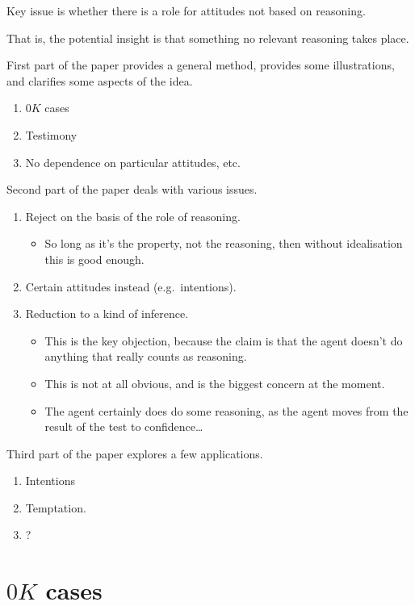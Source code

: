 \documentclass[10pt]{article}
\begin{document}
Key issue is whether there is a role for attitudes not based on reasoning.

That is, the potential insight is that something no relevant reasoning takes place.



First part of the paper provides a general method, provides some illustrations, and clarifies some aspects of the idea.
\begin{enumerate}
\item \(0K\) cases
\item Testimony
\item No dependence on particular attitudes, etc.\
\end{enumerate}

Second part of the paper deals with various issues.
\begin{enumerate}
\item Reject on the basis of the role of reasoning.
  \begin{itemize}
  \item So long as it's the property, not the reasoning, then without idealisation this is good enough.
  \end{itemize}
\item Certain attitudes instead (e.g.\ intentions).
\item Reduction to a kind of inference.
  \begin{itemize}
  \item This is the key objection, because the claim is that the agent doesn't do anything that really counts as reasoning.
  \item This is not at all obvious, and is the biggest concern at the moment.
  \item The agent certainly does do some reasoning, as the agent moves from the result of the test to confidence\dots
  \end{itemize}
\end{enumerate}

Third part of the paper explores a few applications.
\begin{enumerate}
\item Intentions
\item Temptation.
\item ?
\end{enumerate}

\section{\(0K\) cases}
\label{sec:0k-cases}
\end{document}
